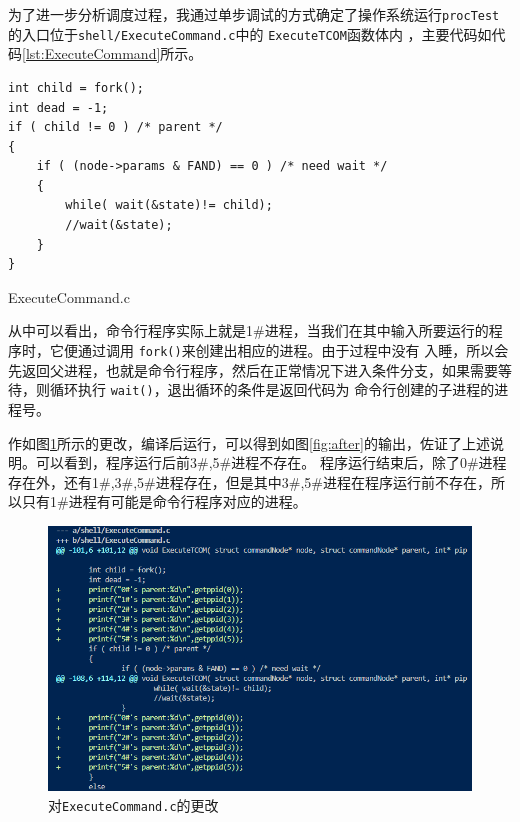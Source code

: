 为了进一步分析调度过程，我通过单步调试的方式确定了操作系统运行\texttt{procTest}的入口位于\texttt{shell/ExecuteCommand.c}中的 \texttt{ExecuteTCOM}函数体内 ，主要代码如代码\ref{lst:ExecuteCommand}所示。

\begin{listing}[htbp]
    \begin{verbatim}
int child = fork();
int dead = -1;
if ( child != 0 ) /* parent */
{
    if ( (node->params & FAND) == 0 ) /* need wait */
    {
        while( wait(&state)!= child);
        //wait(&state);
    }
}
    \end{verbatim}
    \caption{ExecuteCommand.c}\label{lst:ExecuteCommand}
\end{listing}

从中可以看出，命令行程序实际上就是1\#进程，当我们在其中输入所要运行的程序时，它便通过调用 \texttt{fork()}来创建出相应的进程。由于过程中没有
入睡，所以会先返回父进程，也就是命令行程序，然后在正常情况下进入条件分支，如果需要等待，则循环执行 \texttt{wait()}，退出循环的条件是返回代码为
命令行创建的子进程的进程号。

作如图\ref{fig:ExecuteCommand}所示的更改，编译后运行，可以得到如图\ref{fig:after}的输出，佐证了上述说明。可以看到，程序运行后前3\#,5\#进程不存在。
程序运行结束后，除了0\#进程存在外，还有1\#,3\#,5\#进程存在，但是其中3\#,5\#进程在程序运行前不存在，所以只有1\#进程有可能是命令行程序对应的进程。

\begin{figure}[!htbp]
    \centering
    \includegraphics[width=\textwidth]{images/ExecuteCommand.png}
    \caption{对\texttt{ExecuteCommand.c}的更改}\label{fig:ExecuteCommand}
\end{figure}

